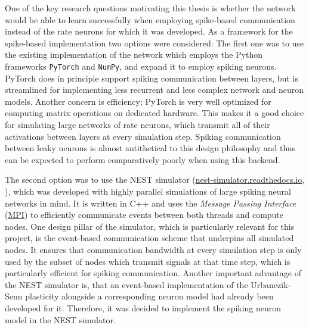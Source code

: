 One of the key research questions motivating this thesis is whether the network would be able to learn successfully when
employing spike-based communication instead of the rate neurons for which it was developed. As a framework for the
spike-based implementation two options were considered: The first one was to use the existing implementation of the
network which employs the Python frameworks \texttt{PyTorch} and \texttt{NumPy}, and expand it to employ spiking
neurons. PyTorch does in principle support spiking communication between layers, but is streamlined for implementing
less recurrent and less complex network and neuron models. Another concern is efficiency; PyTorch is very well optimized
for computing matrix operations on dedicated hardware. This makes it a good choice for simulating large networks of rate
neurons, which transmit all of their activations between layers at every simulation step. Spiking communication between
leaky neurons is almost antithetical to this design philosophy and thus can be expected to perform comparatively poorly
when using this backend.

The second option was to use the NEST simulator
(\href{https://nest-simulator.readthedocs.io}{nest-simulator.readthedocs.io}, \cite{Gewaltig2007}), which was developed
with highly parallel simulations of large spiking neural networks in mind. It is written in C++ and uses the
\textit{Message Passing Interface} (\href{https://www.mpi-forum.org/}{MPI}) to efficiently communicate events between
both threads and compute nodes. One design pillar of the simulator, which is particularly relevant for this project, is
the event-based communication scheme that underpins all simulated nodes. It ensures that communication bandwidth at
every simulation step is only used by the subset of nodes which transmit signals at that time step, which is
particularly efficient for spiking communication. Another important advantage of the NEST simulator is, that an
event-based implementation of the Urbanczik-Senn plasticity alongside a corresponding neuron model had already been
developed for it. Therefore, it was decided to implement the spiking neuron model in the NEST simulator.

